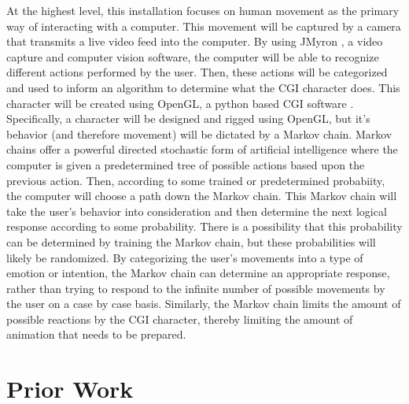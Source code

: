 \documentclass[10pt,twocolumn]{article}
\begin{document}
At the highest level, this installation focuses on human movement as the primary way of interacting with a computer.  This movement will be captured by a camera that transmits a live video feed into the computer.  By using JMyron \cite{noauthor_myron_nodate}, a video capture and computer vision software, the computer will be able to recognize different actions performed by the user. Then, these actions will be categorized and used to inform an algorithm to determine what the CGI character does.  This character will be created using OpenGL, a python based CGI software \cite{andreussi_realtimerendering_nodate}.  Specifically, a character will be designed and rigged using OpenGL, but it’s behavior (and therefore movement) will be dictated by a Markov chain.  Markov chains offer a powerful directed stochastic form of artificial intelligence where the computer is given a predetermined tree of possible actions based upon the previous action.  Then, according to some trained or predetermined probabiity, the computer will choose a path down the Markov chain. This Markov chain will take the user’s behavior into consideration and then determine the next logical response according to some probability.  There is a possibility that this probability can be determined by training the Markov chain, but these probabilities will likely be randomized. 
By categorizing the user’s movements into a type of emotion or intention, the Markov chain can determine an appropriate response, rather than trying to respond to the infinite number of possible movements by the user on a case by case basis. Similarly, the Markov chain limits the amount of possible reactions by the CGI character, thereby limiting the amount of animation that needs to be prepared. 


\section{Prior Work}
\end{document}
